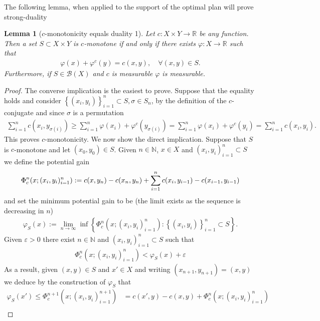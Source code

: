 \documentclass[
    a4paper,
    DIV=14,
    abstract=true,
    numbers=noenddot
]
{scrartcl}
\newtheorem{lemma}[lemma]{Lemma}
\theoremstyle{definition}
\newcommand{\eps}{\varepsilon}
\newcommand{\set}[1]{\left\{#1\right\}}
\newcommand{\N}{\mathbb{N}}
\newcommand{\R}{\mathbb{R}}
\newcommand{\Bb}{\mathcal{B}}
\begin{document}
The following lemma, when applied to the support of the optimal plan will prove strong-duality
\begin{lemma}[$c$-monotonicity equals duality 1]\label{c-monotone set duality}
    Let $c:X \times Y \to \R$ be any function. Then a set $S\subset X\times Y$ is $c$-monotone if and only if there exists $\varphi : X \to \mathbb{R} $ such that
    \begin{align*}
        \varphi (x)+ \varphi ^c(y)= c(x,y), \quad\forall (x,y) \in S.
    \end{align*}
    Furthermore, if $S \in \Bb(X)$  and $c$ is measurable $\varphi$ is measurable.
\end{lemma}
\begin{proof}
    The converse implication  is the easiest to prove. Suppose that the equality holds and consider $\set{(x_i,y_i)}_{i=1}^n \subset  S, \sigma \in S_n$, by the definition of the $c$-conjugate and since $\sigma $ is a permutation 
    \begin{align*}
        \sum_{i=1}^n c(x_i, y_{\sigma (i)}) \geq  \sum_{i=1}^n \varphi(x_i) + \varphi ^c(y_{\sigma (i)})= \sum_{i=1}^n \varphi(x_i) + \varphi ^c(y_{i})=  \sum_{i=1}^n c(x_i, y_{i}).
    \end{align*}
    This proves $c$-monotonicity.  We now show the direct implication. Suppose that $S$ is $c$-monotone and let $(x_0,y_0) \in S$. Given $n \in \N$, $x \in X$ and  $(x_i,y_i)_{i=1}^n \subset S$ we define the potential gain
    \begin{align*}
        \Phi^n_c\qty(x;(x_i,y_i)_{i=1}^n):= c(x,y_n)-c(x_n,y_n)+\sum_{i=1}^n c(x_i,y_{i-1}) -c(x_{i-1},y_{i-1})
    \end{align*}
    and set the minimum potential gain to be (the limit exists as the sequence is decreasing in $n$)
    \begin{align}\label{potential construction}
        \varphi_S(x) := \lim_{n \to \infty}\inf\set{ \Phi^n_c\left(x;(x_i,y_i)_{i=1}^n\right): \set{(x_i,y_i)}_{i=1}^n \subset S}.
    \end{align}
    Given  $\eps >0$  there exist $n \in \N$ and  $(x_i,y_i)_{i=1}^n \subset S$ such that
    \begin{align*}
        \Phi^n_c\left(x;(x_i,y_i)_{i=1}^n\right)<  \varphi_S(x) + \eps
    \end{align*}
    As a result, given $(x,y) \in S$ and $x' \in X$ and writing $(x_{n+1},y_{n+1})=(x,y)$ we deduce by the construction of $\varphi_S $  that
    \begin{align*}
        \varphi_S (x')\leq \Phi^{n+1}_c\left(x;(x_i,y_i)_{i=1}^{n+1}\right) & = c(x',y)-c(x,y)+\Phi^n_c\left(x;(x_i,y_i)_{i=1}^n\right) \\

\end{align*}
\end{proof}
\end{document}
